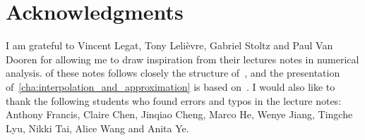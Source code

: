 \chapter*{Acknowledgments}%
\label{cha:acknowledgements}

I am grateful to Vincent Legat, Tony Lelièvre, Gabriel Stoltz and Paul Van Dooren for allowing me to draw inspiration from their lectures notes in numerical analysis.
 of these notes follows closely the structure of~\cite[Chapter 3]{VanDooren},
and the presentation of~\cref{cha:interpolation_and_approximation} is based on~\cite{Legat}.
I would also like to thank the following students who found errors and typos in the lecture notes:
Anthony Francis, Claire Chen, Jinqiao Cheng, Marco He, Wenye Jiang, Tingche Lyu, Nikki Tai, Alice Wang and Anita Ye.
